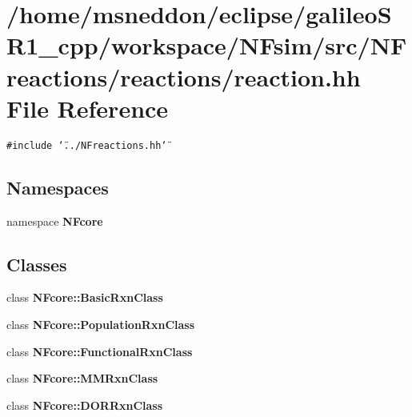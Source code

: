 \section{/home/msneddon/eclipse/galileoSR1\_\-cpp/workspace/NFsim/src/NFreactions/reactions/reaction.hh File Reference}
\label{reaction_8hh}


{\tt \#include \char`\"{}../NFreactions.hh\char`\"{}}\par
\subsection*{Namespaces}
\begin{CompactItemize}
\item 
namespace {\bf NFcore}
\end{CompactItemize}
\subsection*{Classes}
\begin{CompactItemize}
\item 
class {\bf NFcore::BasicRxnClass}
\item 
class {\bf NFcore::PopulationRxnClass}
\item 
class {\bf NFcore::FunctionalRxnClass}
\item 
class {\bf NFcore::MMRxnClass}
\item 
class {\bf NFcore::DORRxnClass}
\end{CompactItemize}
